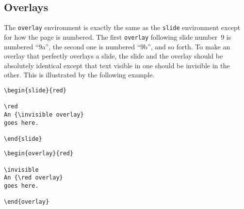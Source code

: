

\subsection{Overlays}

The \xsp{}\mbox{\tt overlay}\xsp{}
environment is exactly the same as the \xsp{}\mbox{\tt slide}\xsp{}
environment except for how the page is numbered.  The first
\xsp{}\mbox{\tt overlay}\xsp{} following slide number~9 is numbered
``9a'', the second one is numbered ``9b'', and so forth.  To make an
overlay that perfectly overlays a slide, the slide and the overlay
should be absolutely identical except that text visible in one should
be invisible in the other.  This is illustrated by the following
example.

\settowidth{\dimen2}{\xipt\sf overlay}
\settowidth{\dimen0}{\xipt \sf An}
\begin{exambox}
\midbox
\begin{verbatim}
\begin{slide}{red}

\red
An {\invisible overlay}
goes here.

\end{slide}
\end{verbatim}
\end{exambox}
\begin{exambox}
\midbox
\begin{verbatim}
\begin{overlay}{red}

\invisible
An {\red overlay}
goes here.

\end{overlay}
\end{verbatim}
\end{exambox}
 
